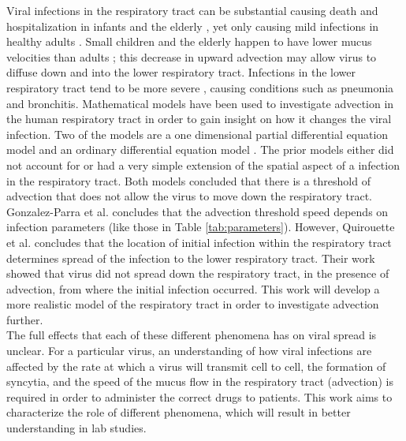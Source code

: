 \documentclass[a4paper]{article}
\begin{document}
\noindent
Viral infections in the respiratory tract can be substantial causing death and hospitalization in infants \cite{Geoghegan} and the elderly \cite{Fleming}, yet only causing mild infections in healthy adults \cite{Hall, Lee, Bagga, Mills}. Small children and the elderly happen to have lower mucus velocities than adults \cite{Sturm, Puchelle, Grubb, Oliveira, Ho}; this decrease in upward advection may allow virus to diffuse down and into the lower respiratory tract. Infections in the lower respiratory tract tend to be more severe \cite{Naorat, Kaneko, Shi, Atwell, HallC, Takeyama, Park}, causing conditions such as pneumonia and bronchitis. Mathematical models have been used to investigate advection in the human respiratory tract in order to gain insight on how it changes the viral infection. Two of the models are a one dimensional partial differential equation model \cite{Quirouette} and an ordinary differential equation model \cite{diffusionmodel}. The prior models either did not account for or had a very simple extension of the spatial aspect of a infection in the respiratory tract. Both models concluded that there is a threshold of advection that does not allow the virus to move down the respiratory tract. Gonzalez-Parra et al. \cite{diffusionmodel} concludes that the advection threshold speed depends on infection parameters (like those in Table \ref{tab:parameters}). However, Quirouette et al. \cite{Quirouette} concludes that the location of initial infection within the respiratory tract determines spread of the infection to the lower respiratory tract. Their work showed that virus did not spread down the respiratory tract, in the presence of advection, from where the initial infection occurred. This work will develop a more realistic model of the respiratory tract in order to investigate advection further.\\

The full effects that each of these different phenomena has on viral spread is unclear. For a particular virus, an understanding of how viral infections are affected by the rate at which a virus will transmit cell to cell, the formation of syncytia, and the speed of the mucus flow in the respiratory tract (advection) is required in order to administer the correct drugs to patients. This work aims to characterize the role of different phenomena, which will result in better understanding in lab studies.
\end{document}
